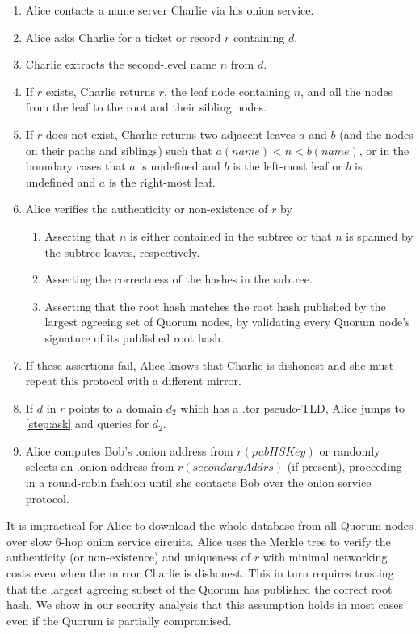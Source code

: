 \documentclass[USenglish,oneside,twocolumn]{article}
\begin{document}
\begin{enumerate}
	\item Alice contacts a name server Charlie via his onion service.
	\item \label{step:ask} Alice asks Charlie for a ticket or record $ r $ containing $ d $.
	\item Charlie extracts the second-level name $ n $ from $ d $.
	\item If $ r $ exists, Charlie returns $ r $, the leaf node containing $ n $, and all the nodes from the leaf to the root and their sibling nodes.
	\item If $ r $ does not exist, Charlie returns two adjacent leaves $ a $ and $ b $ (and the nodes on their paths and siblings) such that $ a(\mathit{name}) < n < b(\mathit{name}) $, or in the boundary cases that $ a $ is undefined and $ b $ is the left-most leaf or $ b $ is undefined and $ a $ is the right-most leaf.
	\item Alice verifies the authenticity or non-existence of $ r $ by 
		\begin{enumerate}
			\item Asserting that $ n $ is either contained in the subtree or that $ n $ is spanned by the subtree leaves, respectively.
			\item Asserting the correctness of the hashes in the subtree.
			\item Asserting that the root hash matches the root hash published by the largest agreeing set of Quorum nodes, by validating every Quorum node's signature of its published root hash. %
		\end{enumerate}
	\item If these assertions fail, Alice knows that Charlie is dishonest and she must repeat this protocol with a different mirror.
	\item If $ d $ in $ r $ points to a domain $ d_{2} $ which has a .tor pseudo-TLD, Alice jumps to \ref{step:ask} and queries for $ d_{2} $.
	\item Alice computes Bob's .onion address from $ r(\mathit{pubHSKey}) $ or randomly selects an .onion address from $ r(\mathit{secondaryAddrs}) $ (if present), proceeding in a round-robin fashion until she contacts Bob over the onion service protocol.
\end{enumerate}

It is impractical for Alice to download the whole database from all Quorum nodes over slow 6-hop onion service circuits. Alice uses the Merkle tree to verify the authenticity (or non-existence) and uniqueness of $ r $ with minimal networking costs even when the mirror Charlie is dishonest. This in turn requires trusting that the largest agreeing subset of the Quorum has published the correct root hash. We show in our security analysis that this assumption holds in most cases even if the Quorum is partially compromised.
\end{document}
